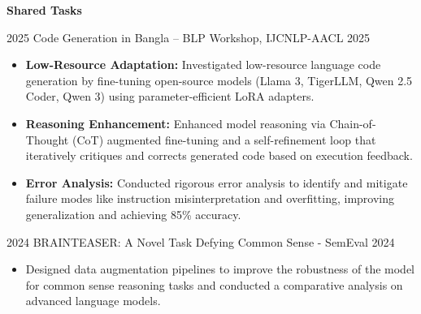
\vspace{.2em}
\hspace{.5em}
{\normalsize \textbf{Shared Tasks}}
\vspace{-0.5em}

\begin{researches}
\research
{2025} {Code Generation in Bangla – BLP Workshop, IJCNLP-AACL 2025}
{} {
\begin{itemize}
    \item \textbf{Low-Resource Adaptation:} Investigated low-resource language code generation by fine-tuning open-source models (Llama 3, TigerLLM, Qwen 2.5 Coder, Qwen 3) using parameter-efficient LoRA adapters.
    \item \textbf{Reasoning Enhancement:} Enhanced model reasoning via Chain-of-Thought (CoT) augmented fine-tuning and a self-refinement loop that iteratively critiques and corrects generated code based on execution feedback.
    \item \textbf{Error Analysis:} Conducted rigorous error analysis to identify and mitigate failure modes like instruction misinterpretation and overfitting, improving generalization and achieving 85\% accuracy.
\end{itemize}
} {}
\end{researches}


\vspace{-2em}

\begin{researches}
    \research
        {2024}   {BRAINTEASER: A Novel Task Defying Common Sense - SemEval 2024}
        {} {
          \begin{itemize}
            \item Designed data augmentation pipelines to improve the robustness of the model for common sense reasoning tasks and conducted a comparative analysis on advanced language models.                                                                    
          \end{itemize}
        } {}
\end{researches}

\vspace{-2em}

